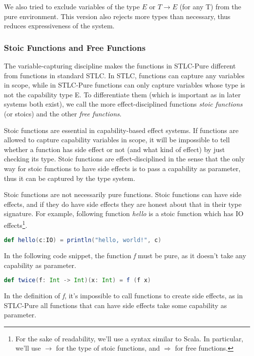 We also tried to exclude variables of the type $E$ or $T \to E$ (for
any T) from the pure environment. This version also rejects more types
than necessary, thus reduces expressiveness of the system.

\subsubsection{Stoic Functions and Free Functions}

The variable-capturing discipline makes the functions in STLC-Pure
different from functions in standard STLC. In STLC, functions can
capture any variables in scope, while in STLC-Pure functions can only
capture variables whose type is not the capability type E. To
differentiate them (which is important as in later systems both
exist), we call the more effect-disciplined functions \emph{stoic
  functions} (or stoics) and the other \emph{free functions}.

Stoic functions are essential in capability-based effect systems. If
functions are allowed to capture capability variables in scope, it
will be impossible to tell whether a function has side effect or not
(and what kind of effect) by just checking its type. Stoic functions
are effect-disciplined in the sense that the only way for stoic
functions to have side effects is to pass a capability as parameter,
thus it can be captured by the type system.

Stoic functions are not necessarily pure functions. Stoic functions
can have side effects, and if they do have side effects they are
honest about that in their type signature. For example, following
function \emph{hello} is a stoic function which has IO
effects\footnote{For the sake of readability, we'll use a syntax
  similar to Scala. In particular, we'll use $\to$ for the type of
  stoic functions, and $\Rightarrow$ for free functions.}.

\begin{lstlisting}[language=Scala]
  def hello(c:IO) = println("hello, world!", c)
\end{lstlisting}

In the following code snippet, the function \emph{f} must be pure, as
it doesn't take any capability as parameter.

\begin{lstlisting}[language=Scala]
  def twice(f: Int -> Int)(x: Int) = f (f x)
\end{lstlisting}

In the definition of \emph{f}, it's impossible to call functions to
create side effects, as in STLC-Pure all functions that can have side
effects take some capability as parameter.

